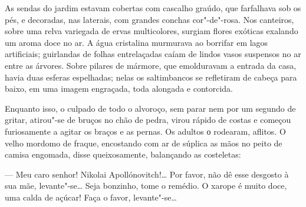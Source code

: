 As sendas do jardim estavam cobertas com cascalho graúdo, que farfalhava
sob os pés, e decoradas, nas laterais, com grandes conchas cor"-de"-rosa.
Nos canteiros, sobre uma relva variegada de ervas multicolores, surgiam
flores exóticas exalando um aroma doce no ar. A água cristalina
murmurava ao borrifar em lagos artificiais; guirlandas de folhas
entrelaçadas caíam de lindos vasos suspensos no ar entre as árvores. Sobre pilares de mármore, que emolduravam a entrada da casa, havia duas
esferas espelhadas; nelas os saltimbancos se refletiram de
cabeça para baixo, em uma imagem engraçada, toda alongada e contorcida.



Enquanto isso, o culpado de todo o alvoroço, sem parar nem por um
segundo de gritar, atirou"-se de bruços no chão de pedra, virou rápido de
costas e começou furiosamente a agitar os braços e as pernas. Os adultos
о rodearam, aflitos. O velho mordomo de fraque, encostando com ar de
súplica as mãos no peito de camisa engomada, disse queixosamente,
balançando as costeletas:

--- Meu caro senhor! Nikolai Apollónovitch!\ldots{} Por favor, não dê esse
desgosto à sua mãe, levante"-se\ldots{} Seja bonzinho, tome o remédio. O
xarope é muito doce, uma calda de açúcar! Faça o favor, levante"-se\ldots{}

